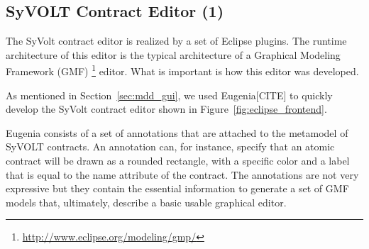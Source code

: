 
% 


\subsection{SyVOLT Contract Editor (1)}

The SyVolt contract editor is realized by a set of Eclipse plugins.
The runtime architecture of this editor is the typical architecture of a
Graphical Modeling Framework (GMF)
\footnote{\url{http://www.eclipse.org/modeling/gmp/}} editor.
What is important is how this editor was developed.

As mentioned in Section~\ref{sec:mdd_gui}, we used Eugenia[CITE] to quickly develop the SyVolt contract editor
shown in Figure~\ref{fig:eclipse_frontend}.

 Eugenia consists of a set of annotations that are attached
to the metamodel of SyVOLT contracts. An annotation can, for instance, specify
that an atomic contract will be drawn as a rounded rectangle, with a specific
color and a label that is equal to the name attribute of the contract.
The annotations are not very expressive but they contain the essential
information to generate a set of GMF models that, ultimately, describe a basic
usable graphical editor.

